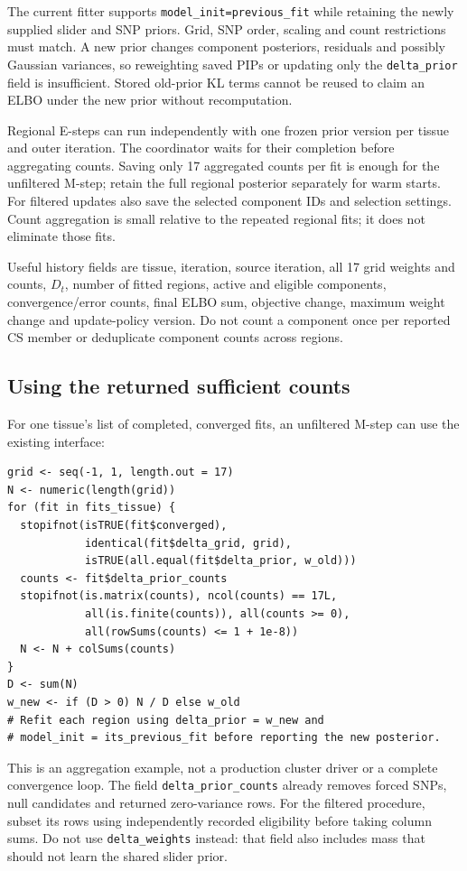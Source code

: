 \documentclass[11pt]{article}
\begin{document}
The current fitter supports \texttt{model\_init=previous\_fit} while
retaining the newly supplied slider and SNP priors. Grid, SNP order,
scaling and count restrictions must match. A new prior changes component
posteriors, residuals and possibly Gaussian variances, so reweighting
saved PIPs or updating only the \texttt{delta\_prior} field is insufficient.
Stored old-prior KL terms cannot be reused to claim an ELBO under the
new prior without recomputation.

Regional E-steps can run independently with one frozen prior version per
tissue and outer iteration. The coordinator waits for their completion
before aggregating counts. Saving only 17 aggregated counts per fit is
enough for the unfiltered M-step; retain the full regional posterior
separately for warm starts. For filtered updates also save the selected
component IDs and selection settings. Count aggregation is small relative
to the repeated regional fits; it does not eliminate those fits.

Useful history fields are tissue, iteration, source iteration, all 17 grid
weights and counts, $D_t$, number of fitted regions, active and eligible
components, convergence/error counts, final ELBO sum, objective change,
maximum weight change and update-policy version. Do not count a component
once per reported CS member or deduplicate component counts across regions.

\subsection{Using the returned sufficient counts}
For one tissue's list of completed, converged fits, an unfiltered M-step
can use the existing interface:
\begin{verbatim}
grid <- seq(-1, 1, length.out = 17)
N <- numeric(length(grid))
for (fit in fits_tissue) {
  stopifnot(isTRUE(fit$converged),
            identical(fit$delta_grid, grid),
            isTRUE(all.equal(fit$delta_prior, w_old)))
  counts <- fit$delta_prior_counts
  stopifnot(is.matrix(counts), ncol(counts) == 17L,
            all(is.finite(counts)), all(counts >= 0),
            all(rowSums(counts) <= 1 + 1e-8))
  N <- N + colSums(counts)
}
D <- sum(N)
w_new <- if (D > 0) N / D else w_old
# Refit each region using delta_prior = w_new and
# model_init = its_previous_fit before reporting the new posterior.
\end{verbatim}
This is an aggregation example, not a production cluster driver or a
complete convergence loop. The field \texttt{delta\_prior\_counts} already
removes forced SNPs, null candidates and returned zero-variance rows.
For the filtered procedure, subset its rows using independently recorded
eligibility before taking column sums. Do not use \texttt{delta\_weights}
instead: that field also includes mass that should not learn the shared
slider prior.
\end{document}
